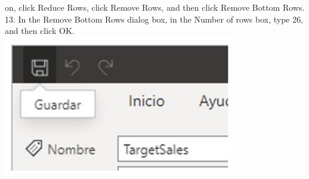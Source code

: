 \documentclass[preprint,12pt]{elsarticle}
\begin{document}
\begin{itemize}
		 		on, click Reduce Rows, click Remove Rows, and then click Remove Bottom Rows.
		 		\\ 13. In the Remove Bottom Rows dialog box, in the Number of rows box, type 26, and then click OK.
		 		\\ \includegraphics[width=10cm]{./IMAGENES/2.30} \\
		 		

\end{itemize}
\end{document}
